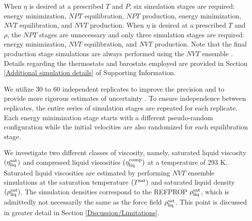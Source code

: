 \documentclass[preprint,review,12pt]{elsarticle}
\begin{document}
	When $\eta$ is desired at a prescribed $T$ and $P$, six simulation stages are required: energy minimization, $NPT$ equilibration, $NPT$ production, energy minimization, $NVT$ equilibration, and $NVT$ production. When $\eta$ is desired at a prescribed $T$ and $\rho$, the $NPT$ stages are unnecessary and only three simulation stages are required: energy minimization, $NVT$ equilibration, and $NVT$ production. Note that the final production stage simulations are always performed using the $NVT$ ensemble \cite{Maginn2018}. Details regarding the thermostats and barostats employed are provided in Section \ref{Additional simulation details} of Supporting Information.
	
	We utilize 30 to 60 independent replicates to improve the precision and to provide more rigorous estimates of uncertainty \cite{Maginn2018,Zhang2015}. To ensure independence between replicates, the entire series of simulation stages are repeated for each replicate. Each energy minimization stage starts with a different pseudo-random configuration while the initial velocities are also randomized for each equilibration stage.
	
	
	
	
	
%	
	
	
		
	We investigate two different classes of viscosity, namely, saturated liquid viscosity $(\eta_{\rm liq}^{\rm sat})$ and compressed liquid viscosities $(\eta_{\rm liq}^{\rm comp})$ at a temperature of 293 K. Saturated liquid viscosities are estimated by performing $NVT$ ensemble simulations at the saturation temperature $(T^{\rm sat})$ and saturated liquid density $(\rho_{\rm liq}^{\rm sat})$. The simulation densities correspond to the REFPROP $\rho_{\rm liq}^{\rm sat}$, which is admittedly not necessarily the same as the force field $\rho_{\rm liq}^{\rm sat}$. This point is discussed in greater detail in Section \ref{Discussion/Limitations}. 
	
\end{document}
